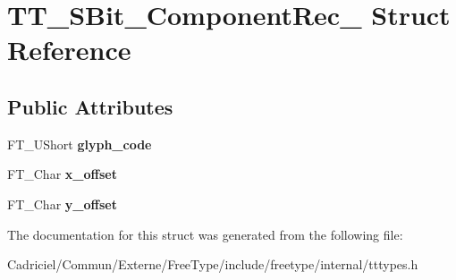 \hypertarget{struct_t_t___s_bit___component_rec__}{}\section{T\+T\+\_\+\+S\+Bit\+\_\+\+Component\+Rec\+\_\+ Struct Reference}
\label{struct_t_t___s_bit___component_rec__}
\subsection*{Public Attributes}
\begin{DoxyCompactItemize}
\item 
F\+T\+\_\+\+U\+Short {\bfseries glyph\+\_\+code}\hypertarget{struct_t_t___s_bit___component_rec___a357eef9c05c65034b506cdd48271e562}{}\label{struct_t_t___s_bit___component_rec___a357eef9c05c65034b506cdd48271e562}

\item 
F\+T\+\_\+\+Char {\bfseries x\+\_\+offset}\hypertarget{struct_t_t___s_bit___component_rec___a97799704aa59bf737e274289fa70ca3f}{}\label{struct_t_t___s_bit___component_rec___a97799704aa59bf737e274289fa70ca3f}

\item 
F\+T\+\_\+\+Char {\bfseries y\+\_\+offset}\hypertarget{struct_t_t___s_bit___component_rec___af24f91b7d5e0268a223514ad68a9a10b}{}\label{struct_t_t___s_bit___component_rec___af24f91b7d5e0268a223514ad68a9a10b}

\end{DoxyCompactItemize}


The documentation for this struct was generated from the following file\+:\begin{DoxyCompactItemize}
\item 
Cadriciel/\+Commun/\+Externe/\+Free\+Type/include/freetype/internal/tttypes.\+h\end{DoxyCompactItemize}
